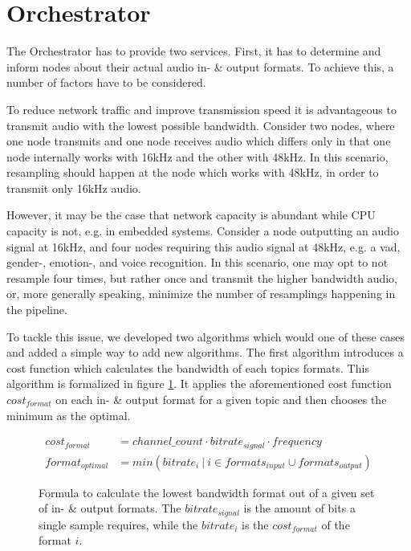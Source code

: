 


\section{Orchestrator}

The Orchestrator has to provide two services.
First, it has to determine and inform nodes about their actual audio in- \& output formats.
To achieve this, a number of factors have to be considered.

To reduce network traffic and improve transmission speed it is advantageous to transmit audio with the lowest possible bandwidth.
Consider two nodes, where one node transmits and one node receives audio which differs only in that one node internally works with 16kHz and the other with 48kHz.
In this scenario, resampling should happen at the node which works with 48kHz, in order to transmit only 16kHz audio.

However, it may be the case that network capacity is abundant while CPU capacity is not, e.g. in embedded systems.
Consider a node outputting an audio signal at 16kHz, and four nodes requiring this audio signal at 48kHz, e.g. a \gls{vad}, gender-, emotion-, and voice recognition.
In this scenario, one may opt to not resample four times, but rather once and transmit the higher bandwidth audio, or, more generally speaking, minimize the number of resamplings happening in the pipeline.

To tackle this issue, we developed two algorithms which would one of these cases and added a simple way to add new algorithms.
The first algorithm introduces a cost function which calculates the bandwidth of each topics formats.
This algorithm is formalized in figure \ref{main:orc:resampling:formula:min_traffic}.
It applies the aforementioned cost function $cost_{format}$ on each in- \& output format for a given topic and then chooses the minimum as the optimal.

\begin{figure}
	\begin{align}
	cost_{format} &= channel\_count \cdot bitrate_{signal} \cdot frequency\\
	format_{optimal} &= min({bitrate_{i}\ |\ i \in formats_{input} \cup formats_{output}})
	\end{align}
	\caption{Formula to calculate the lowest bandwidth format out of a given set of in- \& output formats.
		The $bitrate_{signal}$ is the amount of bits a single sample requires, while the $bitrate_{i}$ is the $cost_{format}$ of the format $i$.}
	\label{main:orc:resampling:formula:min_traffic}
\end{figure}

